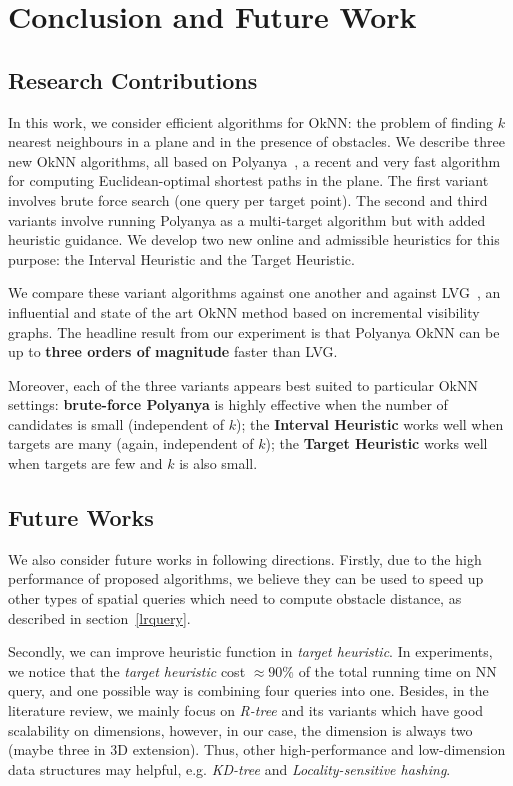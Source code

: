 \chapter{Conclusion and Future Work}\label{conclusionfuture}
\section{Research Contributions}\label{contribution}

In this work, we consider efficient algorithms for OkNN:
the problem of finding $k$ nearest neighbours in a plane and in the presence of obstacles.
We describe three new OkNN algorithms, all based on Polyanya~\cite{cuicompromise},
a recent and very fast algorithm for computing Euclidean-optimal shortest paths in the plane.
The first variant involves brute force search (one query per target point).
The second and third variants involve running Polyanya as a multi-target algorithm but with added heuristic guidance.
We develop two new online and admissible heuristics for this purpose: the Interval Heuristic and the Target Heuristic.

We compare these variant algorithms against one another and against LVG~\cite{zhang2004spatial},
an influential and state of the art OkNN method based on incremental visibility graphs.
The headline result from our experiment is that Polyanya OkNN can be up to
\textbf{three orders of magnitude} faster than LVG.

Moreover, each of the three variants appears best suited to particular OkNN settings:
\textbf{brute-force Polyanya} is highly effective when the number of candidates is small (independent of $k$);
the \textbf{Interval Heuristic} works well when targets are many (again, independent of $k$);
the \textbf{Target Heuristic} works well when targets are few and $k$ is also small.

\section{Future Works}\label{future}
We also consider future works in following directions.
Firstly, due to the high performance of proposed algorithms, we believe they can be used to
speed up other types of spatial queries which need to compute obstacle distance,
as described in section~\ref{lrquery}.

Secondly, we can improve heuristic function in \textit{target heuristic}.
In experiments, we notice that the \textit{target heuristic} cost $\approx 90\%$ of
the total running time on NN query, and one possible way is combining four queries into one.
Besides, in the literature review, we mainly focus on \textit{R-tree} and its variants which
have good scalability on dimensions, however, in our case, the dimension is always two (maybe
three in 3D extension). Thus, other high-performance and low-dimension data structures may helpful,
e.g. \textit{KD-tree}\cite{ooi1987spatial} and
\textit{Locality-sensitive hashing}\cite{slaney2008locality}.

